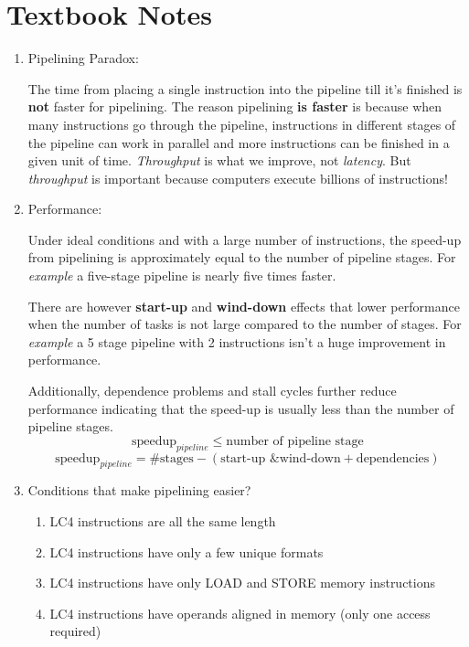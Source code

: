 \documentclass[12pt]{article}
\newenvironment{QandA}{\begin{enumerate}[label=\bfseries\arabic*.]\bfseries}
                      {\end{enumerate}}
\newenvironment{answered}{\par\quad\normalfont}{}
\begin{document}
\section{Textbook Notes}
\begin{QandA}
   \item Pipelining Paradox:
   \begin{answered}
    The time from placing a single instruction into the pipeline till it's finished is \textbf{not} faster for pipelining. The reason pipelining \textbf{is faster} is because when many instructions go through the pipeline, instructions in different stages of the pipeline can work in parallel and more instructions can be finished in a given unit of time. \textit{Throughput} is what we improve, not \textit{latency}. But \textit{throughput} is important because computers execute billions of instructions!
   \end{answered}
   
   \item Performance:
   \begin{answered}
   Under ideal conditions and with a large number of instructions, the speed-up from pipelining is approximately equal to the number of pipeline stages. For \textit{example} a five-stage pipeline is nearly five times faster. 
   
   There are however \textbf{start-up} and \textbf{wind-down} effects that lower performance when the number of tasks is not large compared to the number of stages. For \textit{example} a 5 stage pipeline with 2 instructions isn't a huge improvement in performance. 
   
   Additionally, dependence problems and stall cycles further reduce performance indicating that the speed-up is usually less than the number of pipeline stages.
   \begin{equation*}
       \text{speedup}_{pipeline} \leq \text{number of pipeline stage}
   \end{equation*}
      \begin{equation*}
       \text{speedup}_{pipeline} = \text{\#stages} - (\text{start-up \& wind-down} + \text{dependencies})
   \end{equation*}
   \end{answered}
   
   \item Conditions that make pipelining easier?
   \begin{answered}
   \begin{enumerate}
       \item LC4 instructions are all the same length
       \item LC4 instructions have only a few unique formats
       \item LC4 instructions have only LOAD and STORE memory instructions
       \item LC4 instructions have operands aligned in memory (only one access required)
   \end{enumerate}
   \end{answered}
   

\end{QandA}
\end{document}
